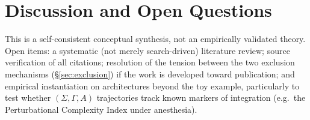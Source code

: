 \documentclass[11pt]{article}
\begin{document}
\section{Discussion and Open Questions}



This is a self-consistent conceptual synthesis, not an empirically validated theory. Open items: a systematic (not merely search-driven) literature review; source verification of all citations; resolution of the tension between the two exclusion mechanisms (\S\ref{sec:exclusion}) if the work is developed toward publication; and empirical instantiation on architectures beyond the toy example, particularly to test whether $(\Sigma,\Gamma,A)$ trajectories track known markers of integration (e.g.\ the Perturbational Complexity Index under anesthesia).
\end{document}
